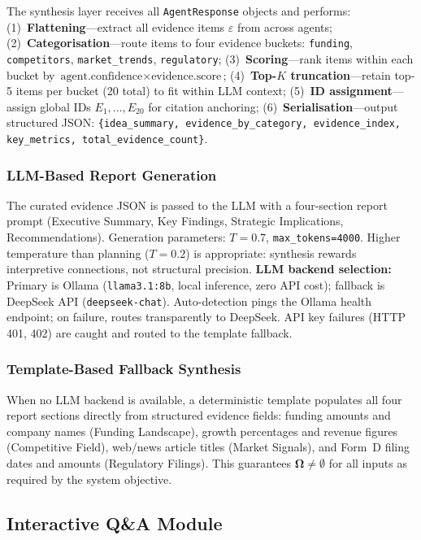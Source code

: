 \documentclass[preprint,12pt]{elsarticle}
\newcommand{\Om}{\boldsymbol{\Omega}}
\begin{document}
The synthesis layer receives all \texttt{AgentResponse} objects and performs:
(1)~\textbf{Flattening}---extract all evidence items $\varepsilon$ from across
agents;
(2)~\textbf{Categorisation}---route items to four evidence buckets:
\texttt{funding}, \texttt{competitors}, \texttt{market\_trends},
\texttt{regulatory};
(3)~\textbf{Scoring}---rank items within each bucket by
$\text{agent.confidence} \times \text{evidence.score}$;
(4)~\textbf{Top-$K$ truncation}---retain top-5 items per bucket (20 total) to
fit within LLM context;
(5)~\textbf{ID assignment}---assign global IDs $E_1, \ldots, E_{20}$ for
citation anchoring;
(6)~\textbf{Serialisation}---output structured JSON:
\texttt{\{idea\_summary, evidence\_by\_category, evidence\_index, key\_metrics,
total\_evidence\_count\}}.

\subsubsection{LLM-Based Report Generation}

The curated evidence JSON is passed to the LLM with a four-section report prompt
(Executive Summary, Key Findings, Strategic Implications, Recommendations).
Generation parameters: $T{=}0.7$, \texttt{max\_tokens=4000}. Higher temperature
than planning ($T{=}0.2$) is appropriate: synthesis rewards interpretive
connections, not structural precision. \textbf{LLM backend selection:} Primary
is Ollama (\texttt{llama3.1:8b}, local inference, zero API cost); fallback is
DeepSeek API (\texttt{deepseek-chat}). Auto-detection pings the Ollama health
endpoint; on failure, routes transparently to DeepSeek. API key failures (HTTP
401, 402) are caught and routed to the template fallback.

\subsubsection{Template-Based Fallback Synthesis}

When no LLM backend is available, a deterministic template populates all four
report sections directly from structured evidence fields: funding amounts and
company names (Funding Landscape), growth percentages and revenue figures
(Competitive Field), web/news article titles (Market Signals), and Form~D filing
dates and amounts (Regulatory Filings). This guarantees $\Om \ne \emptyset$ for
all inputs as required by the system objective.

\subsection{Interactive Q\&A Module}
\end{document}
